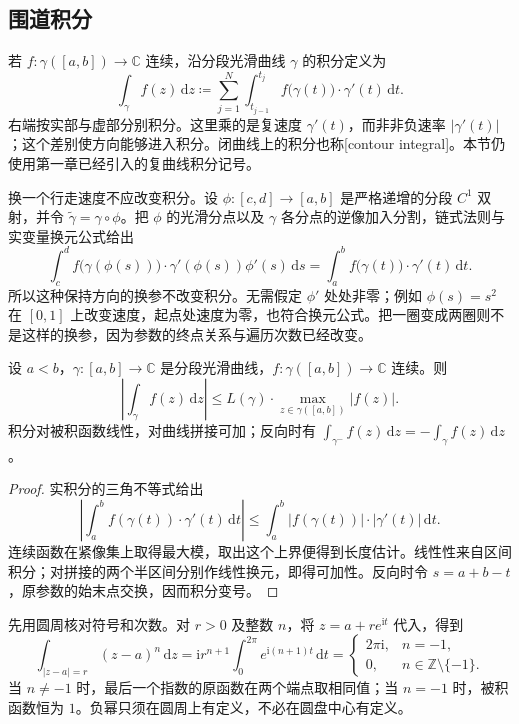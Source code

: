 \subsection{围道积分}
\label{b3:subsec:020102}

若 \(f:\gamma([a,b])\to\mathbb C\) 连续，沿分段光滑曲线 \(\gamma\) 的积分定义为
\[
 \int_\gamma f(z)\,\mathrm{d}z
 \coloneqq\sum_{j=1}^N\int_{t_{j-1}}^{t_j}
 f\bigl(\gamma(t)\bigr)\cdot\gamma'(t)\,\mathrm{d}t.
\]
右端按实部与虚部分别积分。这里乘的是复速度 \(\gamma'(t)\)，而非非负速率 \(|\gamma'(t)|\)；这个差别使方向能够进入积分。闭曲线上的积分也称[contour integral]。本节仍使用第一章已经引入的复曲线积分记号。

\ProseParagraphBreak

换一个行走速度不应改变积分。设 \(\phi:[c,d]\to[a,b]\) 是严格递增的分段 \(C^1\) 双射，并令 \(\widetilde\gamma=\gamma\circ\phi\)。把 \(\phi\) 的光滑分点以及 \(\gamma\) 各分点的逆像加入分割，链式法则与实变量换元公式给出
\[
 \int_c^d f\bigl(\gamma(\phi(s))\bigr)
 \cdot\gamma'(\phi(s))\phi'(s)\,\mathrm{d}s
 =\int_a^b f\bigl(\gamma(t)\bigr)\cdot\gamma'(t)\,\mathrm{d}t.
\]
所以这种保持方向的换参不改变积分。无需假定 \(\phi'\) 处处非零；例如 \(\phi(s)=s^2\) 在 \([0,1]\) 上改变速度，起点处速度为零，也符合换元公式。把一圈变成两圈则不是这样的换参，因为参数的终点关系与遍历次数已经改变。

\begin{proposition}\label{b3:prop:02-ml}
设 \(a<b\)，\(\gamma:[a,b]\to\mathbb C\) 是分段光滑曲线，\(f:\gamma([a,b])\to\mathbb C\) 连续。则
\[
 \left|\int_\gamma f(z)\,\mathrm{d}z\right|
 \le L(\gamma)\cdot\max_{z\in\gamma([a,b])}|f(z)|.
\]
积分对被积函数线性，对曲线拼接可加；反向时有
\(\int_{\gamma^-}f(z)\,\mathrm{d}z=-\int_\gamma f(z)\,\mathrm{d}z\)。
\end{proposition}
\begin{proof}
实积分的三角不等式给出
\[
 \left|\int_a^b f(\gamma(t))\cdot\gamma'(t)\,\mathrm{d}t\right|
 \le\int_a^b|f(\gamma(t))|\cdot|\gamma'(t)|\,\mathrm{d}t.
\]
连续函数在紧像集上取得最大模，取出这个上界便得到长度估计。线性性来自区间积分；对拼接的两个半区间分别作线性换元，即得可加性。反向时令 \(s=a+b-t\)，原参数的始末点交换，因而积分变号。
\end{proof}

先用圆周核对符号和次数。对 \(r>0\) 及整数 \(n\)，将 \(z=a+re^{\mathrm{i}t}\) 代入，得到
\[
 \int_{|z-a|=r}(z-a)^n\,\mathrm{d}z
 =\mathrm{i}r^{n+1}\int_0^{2\pi}e^{\mathrm{i}(n+1)t}\,\mathrm{d}t
 =\begin{cases}
 2\pi\mathrm{i},&n=-1,\\
 0,&n\in\mathbb Z\setminus\{-1\}.
 \end{cases}
\]
当 \(n\ne-1\) 时，最后一个指数的原函数在两个端点取相同值；当 \(n=-1\) 时，被积函数恒为 \(1\)。负幂只须在圆周上有定义，不必在圆盘中心有定义。


